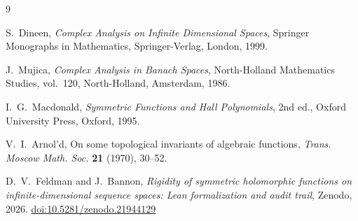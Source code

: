 \documentclass[11pt]{amsart}
\theoremstyle{plain}
\theoremstyle{definition}
\theoremstyle{remark}
\begin{document}
\begin{thebibliography}{9}

S.~Dineen,
\emph{Complex Analysis on Infinite Dimensional Spaces},
Springer Monographs in Mathematics, Springer-Verlag, London, 1999.

J.~Mujica,
\emph{Complex Analysis in Banach Spaces},
North-Holland Mathematics Studies, vol.~120, North-Holland, Amsterdam, 1986.

I.~G.~Macdonald,
\emph{Symmetric Functions and Hall Polynomials},
2nd ed., Oxford University Press, Oxford, 1995.

V.~I.~Arnol'd,
On some topological invariants of algebraic functions,
\emph{Trans. Moscow Math. Soc.} \textbf{21} (1970), 30--52.

D.~V.~Feldman and J.~Bannon, \emph{Rigidity of symmetric holomorphic
functions on infinite-dimensional sequence spaces: Lean formalization and
audit trail}, Zenodo, 2026.
\href{https://doi.org/10.5281/zenodo.21944129}{doi:10.5281/zenodo.21944129}

\end{thebibliography}
\end{document}
